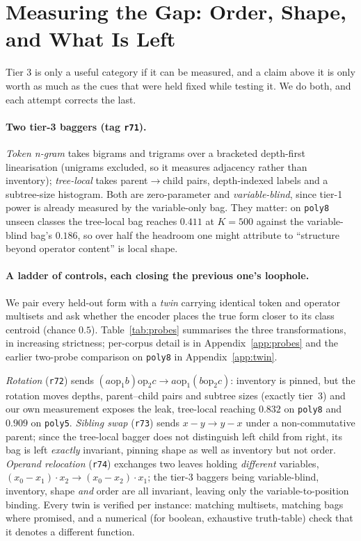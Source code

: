 \section{Measuring the Gap: Order, Shape, and What Is Left}
\label{sec:tier3}

Tier 3 is only a useful category if it can be measured, and a claim above it is only worth as much
as the cues that were held fixed while testing it. We do both, and each attempt corrects the last.

\paragraph{Two tier-3 baggers (tag \texttt{r71}).} \emph{Token n-gram} takes bigrams and trigrams
over a bracketed depth-first linearisation (unigrams excluded, so it measures adjacency rather than
inventory); \emph{tree-local} takes parent$\to$child pairs, depth-indexed labels and a subtree-size
histogram. Both are zero-parameter and \emph{variable-blind}, since tier-1 power is already measured
by the variable-only bag. They matter: on \texttt{poly8} unseen classes the tree-local bag reaches
$0.411$ at $K{=}500$ against the variable-blind bag's $0.186$, so over half the headroom one might
attribute to ``structure beyond operator content'' is local shape.



\paragraph{A ladder of controls, each closing the previous one's loophole.} We pair every held-out
form with a \emph{twin} carrying identical token and operator multisets and ask whether the encoder
places the true form closer to its class centroid (chance $0.5$). Table~\ref{tab:probes} summarises
the three transformations, in increasing strictness; per-corpus detail is in
Appendix~\ref{app:probes} and the earlier two-probe comparison on \texttt{poly8} in
Appendix~\ref{app:twin}.

\emph{Rotation} (\texttt{r72}) sends $(a \mathbin{\text{op}_1} b) \mathbin{\text{op}_2} c \to
a \mathbin{\text{op}_1} (b \mathbin{\text{op}_2} c)$: inventory is pinned, but the rotation moves
depths, parent--child pairs and subtree sizes (exactly tier~3) and our own measurement exposes
the leak, tree-local reaching $0.832$ on \texttt{poly8} and $0.909$ on \texttt{poly5}. \emph{Sibling
swap} (\texttt{r73}) sends $x - y \to y - x$ under a non-commutative parent; since the tree-local
bagger does not distinguish left child from right, its bag is left \emph{exactly} invariant, pinning
shape as well as inventory but not order. \emph{Operand relocation} (\texttt{r74}) exchanges two
leaves holding \emph{different} variables, $(x_0 - x_1)\cdot x_2 \to (x_0 - x_2)\cdot x_1$; the
tier-3 baggers being variable-blind, inventory, shape \emph{and} order are all invariant, leaving
only the variable-to-position binding. Every twin is verified per instance: matching multisets,
matching bags where promised, and a numerical (for boolean, exhaustive truth-table) check that it
denotes a different function.

